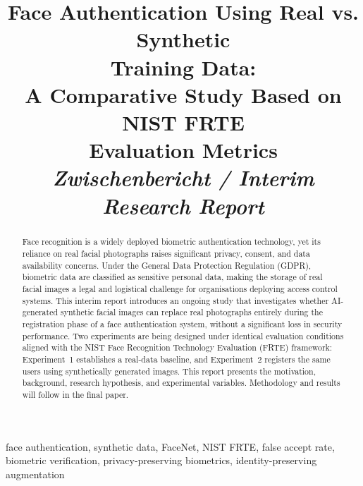 \documentclass[conference]{IEEEtran}
\begin{document}
\title{Face Authentication Using Real vs. Synthetic\\Training Data:\\
A Comparative Study Based on NIST FRTE\\Evaluation Metrics\\[0.4em]
{\large \textit{Zwischenbericht / Interim Research Report}}}

\author{
}

\maketitle

\begin{abstract}
Face recognition is a widely deployed biometric authentication
technology, yet its reliance on real facial photographs raises
significant privacy, consent, and data availability concerns.
Under the General Data Protection Regulation (GDPR), biometric
data are classified as sensitive personal data, making the
storage of real facial images a legal and logistical challenge
for organisations deploying access control systems. This
interim report introduces an ongoing study that investigates
whether AI-generated synthetic facial images can replace real
photographs entirely during the registration phase of a face
authentication system, without a significant loss in security
performance. Two experiments are being designed under identical
evaluation conditions aligned with the NIST Face Recognition
Technology Evaluation (FRTE) framework: Experiment~1
establishes a real-data baseline, and Experiment~2 registers
the same users using synthetically generated images. This
report presents the motivation, background, research
hypothesis, and experimental variables. Methodology and
results will follow in the final paper.
\end{abstract}

\begin{IEEEkeywords}
face authentication, synthetic data, FaceNet, NIST FRTE,
false accept rate, biometric verification, privacy-preserving
biometrics, identity-preserving augmentation
\end{IEEEkeywords}
\end{document}

